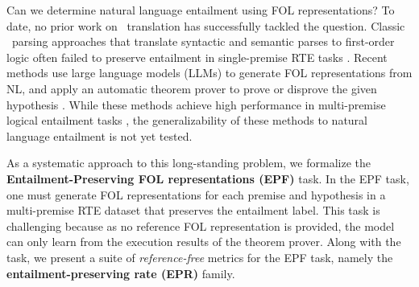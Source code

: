 Can we determine natural language entailment using FOL representations?
To date, no prior work on \nltofol\ translation has successfully tackled the question. Classic \nltofol\ parsing approaches that translate syntactic and semantic parses to first-order logic often failed to preserve entailment in single-premise RTE tasks \citep{bos-markert-2005-recognising, bos-nli}. 
Recent methods use large language models (LLMs) to generate FOL representations from NL, and apply an automatic theorem prover to prove or disprove the given hypothesis \citep{linc, logiclm}. While these methods achieve high performance in multi-premise logical entailment tasks \citep{tafjord-etal-2021-proofwriter, folio}, the generalizability of these methods to natural language entailment is not yet tested.

As a systematic approach to this long-standing problem, we formalize the \textbf{Entailment-Preserving FOL representations (EPF)} task. In the EPF task, one must generate FOL representations for each premise and hypothesis in a multi-premise RTE dataset that preserves the entailment label. This task is challenging because as no reference FOL representation is provided, the model can only learn from the execution results of the theorem prover. Along with the task, we present a suite of \textit{reference-free} metrics for the EPF task, namely the \textbf{entailment-preserving rate (EPR)} family.

